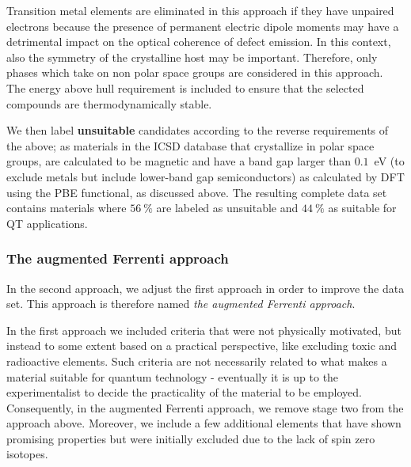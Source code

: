 \documentclass[superscriptaddress,unsortedaddress,
 amsmath,amssymb,
 aps,
]{revtex4-2}
\begin{document}
Transition metal elements are eliminated in this approach if they have unpaired electrons because the presence of permanent electric dipole moments may have a detrimental impact on the optical coherence of defect emission. In this context, also the symmetry of the crystalline host may be important. Therefore, only phases which take on non polar space groups are considered in this approach. 
The energy above hull requirement is included to ensure that the selected compounds are thermodynamically stable. 

We then label \textbf{unsuitable} candidates according to the reverse requirements of the above; as materials in the ICSD database %
that crystallize in polar space groups, are calculated to be magnetic and have a band gap larger than $0.1$~eV (to exclude metals but include lower-band gap semiconductors) as calculated by DFT using the PBE functional, as discussed above.
The resulting complete data set contains materials where $56 \ \%$ are labeled as unsuitable and $44 \ \%$ as suitable for QT applications. 

\subsubsection*{The augmented Ferrenti approach}
In the second approach, we adjust the first approach in order to improve the data set. This approach is therefore named \emph{the augmented Ferrenti approach}.

In the first approach we included criteria that were not physically motivated, but instead to some extent based on a  practical perspective, like excluding toxic and radioactive elements. Such criteria are not necessarily related to what makes a material suitable for quantum technology - eventually it is up to the experimentalist to decide the practicality of the material to be employed. 
Consequently, in the augmented Ferrenti approach, we remove stage two from the approach above. Moreover, we include a few additional elements that have shown promising properties but were initially excluded due to the lack of spin zero isotopes. 
\end{document}

